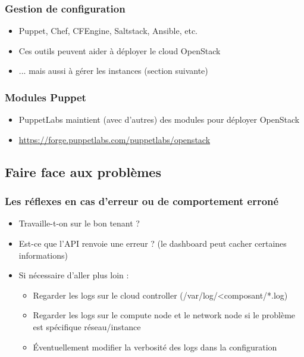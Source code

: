   \begin{frame}
    \frametitle{Gestion de configuration}
    \begin{itemize}
      \item Puppet, Chef, CFEngine, Saltstack, Ansible, etc.\pause
      \item Ces outils peuvent aider à déployer le cloud OpenStack
      \item ... mais aussi à gérer les instances (section suivante)
    \end{itemize}
  \end{frame}

  \begin{frame}
    \frametitle{Modules Puppet}
    \begin{itemize}
      \item PuppetLabs maintient (avec d'autres) des modules pour déployer OpenStack
      \item \url{https://forge.puppetlabs.com/puppetlabs/openstack}
    \end{itemize}
  \end{frame}

  \subsection[Problèmes]{Faire face aux problèmes}

  \begin{frame}
    \frametitle{Les réflexes en cas d'erreur ou de comportement erroné}
    \begin{itemize}
      \item Travaille-t-on sur le bon tenant ?
      \item Est-ce que l'API renvoie une erreur ? (le dashboard peut cacher certaines informations)
      \item Si nécessaire d'aller plus loin :
        \begin{itemize}
          \item Regarder les logs sur le cloud controller (/var/log/<composant/*.log)
          \item Regarder les logs sur le compute node et le network node si le problème est spécifique réseau/instance
          \item Éventuellement modifier la verbosité des logs dans la configuration
        \end{itemize}
    \end{itemize}
  \end{frame}

